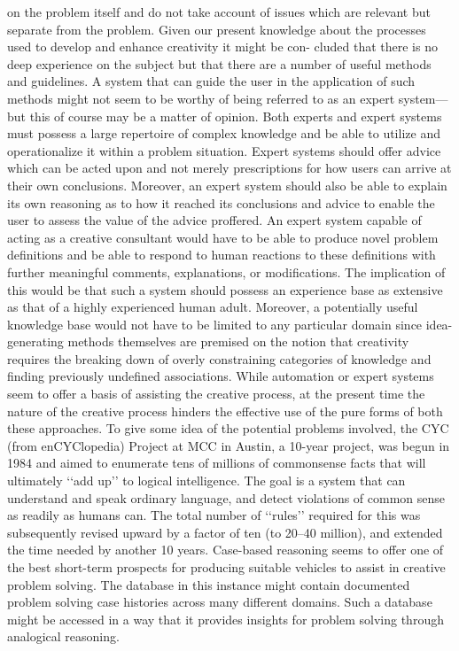 \documentclass[a4paper]{Thesis}
\begin{document}
on the problem itself and do not take account of
issues which are relevant but separate from the
problem.
Given our present knowledge about the processes
used to develop and enhance creativity it might be con-
cluded that there is no deep experience on the subject
but that there are a number of useful methods and
guidelines. A system that can guide the user in the application
of such methods might not seem to be worthy
of being referred to as an expert system—but this of
course may be a matter of opinion.
Both experts and expert systems must possess a large
repertoire of complex knowledge and be able to utilize
and operationalize it within a problem situation. Expert
systems should offer advice which can be acted
upon and not merely prescriptions for how users can
arrive at their own conclusions. Moreover, an expert
system should also be able to explain its own reasoning
as to how it reached its conclusions and advice to enable
the user to assess the value of the advice proffered.
An expert system capable of acting as a creative consultant
would have to be able to produce novel problem
definitions and be able to respond to human reactions
to these definitions with further meaningful
comments, explanations, or modifications. The implication
of this would be that such a system should possess
an experience base as extensive as that of a highly
experienced human adult. Moreover, a potentially useful
knowledge base would not have to be limited to
any particular domain since idea-generating methods
themselves are premised on the notion that creativity
requires the breaking down of overly constraining categories
of knowledge and finding previously undefined
associations.
While automation or expert systems seem to offer a
basis of assisting the creative process, at the present time
the nature of the creative process hinders the effective
use of the pure forms of both these approaches. To
give some idea of the potential problems involved, the
CYC (from enCYClopedia) Project at MCC in Austin, a
10-year project, was begun in 1984 and aimed to enumerate
tens of millions of commonsense facts that will
ultimately ‘‘add up’’ to logical intelligence. The goal is
a system that can understand and speak ordinary language,
and detect violations of common sense as readily
as humans can. The total number of ‘‘rules’’ required for
this was subsequently revised upward by a factor of ten
(to 20–40 million), and extended the time needed by
another 10 years.
Case-based reasoning seems to offer one of the best
short-term prospects for producing suitable vehicles
to assist in creative problem solving. The database in
this instance might contain documented problem solving
case histories across many different domains. Such
a database might be accessed in a way that it provides
insights for problem solving through analogical
reasoning.
\end{document}
